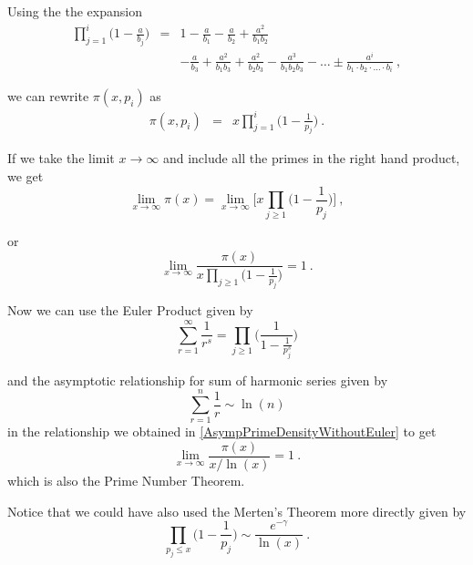 \documentclass{article}
\numberwithin{equation}{section}
\begin{document}
Using the the expansion
\begin{eqnarray} 
\prod\limits_{j=1}^i \Big( 1 - \frac{a}{b_j} \Big) &=& 1 - \frac{a}{b_1} - \frac{a}{b_2} + \frac{a^2}{b_1 b_2} 
\nonumber\\
{} & & - \frac{a}{b_3} + \frac{a^2}{b_1 b_3} + \frac{a^2}{b_2 b_3} - \frac{a^3}{b_1 b_2 b_3} - \ldots \pm \frac{a^{i}}{b_1 \cdot b_2 \cdot \ldots \cdot b_i} \label{SeriesExpansion} ~ ,
\end{eqnarray}

we can rewrite $\pi(x,p_i)$ as
\begin{eqnarray}
\pi(x,p_i) & = & x \prod\limits_{j = 1}^i {\Big(1-\frac{1}{{p_j }}\Big)} \label{PrimeDensityWithoutEuler} ~ .
\end{eqnarray}

If we take the limit $x \to \infty$ and include all the primes in the right hand product, we get
\begin{equation} \label{PrimeDensityWithoutEulerA}
\lim_{x \to \infty}\pi(x) =\lim_{x \to \infty} \Big[ x \prod\limits_{j \ge 1} {\Big(1-\frac{1}{{p_j }}\Big)} \Big] ~ ,
\end{equation}

or
\begin{equation} \label{AsympPrimeDensityWithoutEuler}
\lim_{x \to \infty} \frac{\pi(x)}{x \prod\limits_{j \ge 1} {\Big(1-\frac{1}{{p_j }}\Big)}} = 1 ~ .
\end{equation}

Now we can use the Euler Product \cite{EulerProduct} given by
\begin{equation} \label{EulersFormula}
\sum_{r =1}^\infty \frac{1}{r^s} = \prod\limits_{j \ge 1}{\Big(\frac{1}{1-\frac{1}{{p_j^s}}}\Big)} 
\end{equation}

and the asymptotic relationship for sum of harmonic series \cite{HarmonicSeries} given by
\begin{equation} \label{AsymptoticHarmonicEq}
\sum_{r=1}^n \frac{1}{r} \sim \ln(n)
\end{equation}
in the relationship we obtained in \eqref{AsympPrimeDensityWithoutEuler} to get
\begin{equation} \label{PrimeDensityWithEuler}
\lim_{x \to \infty} \frac{\pi{}(x)}{x / \ln(x)}=1 ~ .
\end{equation}
which is also the Prime Number Theorem.

Notice that we could have also used the Merten's Theorem \cite{IntroNT} more directly given by
\begin{equation} \label{MertenTheorem}
\prod\limits_{p_j \le x}{\Big(1-\frac{1}{{p_j}}}\Big) \sim \frac{e^{-\gamma}}{\ln(x)} ~ .
\end{equation}
\end{document}
